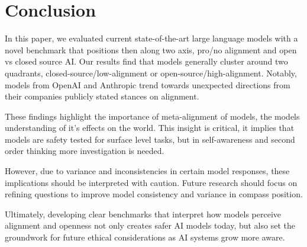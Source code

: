 \section{Conclusion}

In this paper, we evaluated current state-of-the-art large language models with a novel benchmark that positions then along two axis, pro/no alignment and open vs closed source AI. Our results find that models generally cluster around two quadrants, closed-source/low-alignment or open-source/high-alignment. Notably, models from OpenAI and Anthropic trend towards unexpected directions from their companies publicly stated stances on alignment.

These findings highlight the importance of meta-alignment of models, the models understanding of it's effects on the world. This insight is critical, it implies that models are safety tested for surface level tasks, but in self-awareness and second order thinking more investigation is needed.

However, due to variance and inconsistencies in certain model responses, these implications should be interpreted with caution. Future research should focus on refining questions to improve model consistency and variance in compass position.

Ultimately, developing clear benchmarks that interpret how models perceive alignment and openness not only creates safer AI models today, but also set the groundwork for future ethical considerations as AI systems grow more aware.